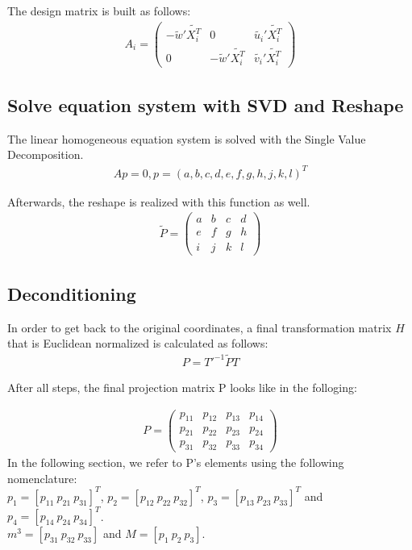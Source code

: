 \documentclass[a4paper,headings=small]{scrartcl}
\numberwithin{equation}{section} %
\numberwithin{figure}{section}   %
\begin{document}
  The design matrix is built as follows: \\
  \begin{align}
  A_{i}=
  \left( \begin{array}{ccc}
  -\tilde{w}'\tilde{X_i^T} & 0 & \tilde{u_i}'\tilde{X_i^T} \\
  0 & -\tilde{w}'\tilde{X_i^T} & \tilde{v_i}'\tilde{X_i^T}
  \end{array} \right) 
  \end{align}

  \subsection{Solve equation system with SVD and Reshape}

  The linear homogeneous equation system is solved with the Single Value Decomposition.
  \begin{align}
  Ap=0, p=(a,b,c,d,e,f,g,h,j,k,l)^T 
  \end{align}

  Afterwards, the reshape is realized with this function as well.
  \begin{align}
  \tilde{P}=
  \left( \begin{array}{cccc}
  a & b & c & d \\
  e & f & g & h \\ 
  i & j & k & l
  \end{array} \right)
  \end{align}

  \subsection{Deconditioning}
In order to get back to the original coordinates, a final transformation matrix $H$ 
that is Euclidean normalized is calculated as follows:
\begin{align}
P=T'^{-1}\tilde{P}T
\end{align}

After all steps, the final projection matrix P looks like in the folloging:

\begin{align}
P=
\left( \begin{array}{cccc}
p_{11} & p_{12} & p_{13} & p_{14} \\
p_{21} & p_{22} & p_{23} & p_{24} \\
p_{31} & p_{32} & p_{33} & p_{34}
\end{array} \right) 
\end{align}
In the following section, we refer to P's elements using the following nomenclature:\\
$p_1=[p_{11} \  p_{21} \  p_{31}]^T$, $p_2=[p_{12} \  p_{22} \  p_{32}]^T$, $p_3=[p_{13} \  p_{23} \  p_{33}]^T$ and $p_4=[p_{14} \  p_{24} \  p_{34}]^T$.\\
$m^{3}=[p_{31} \  p_{32} \  p_{33}]$ and $M=[p_{1} \  p_{2} \  p_{3}]$.
\end{document}

